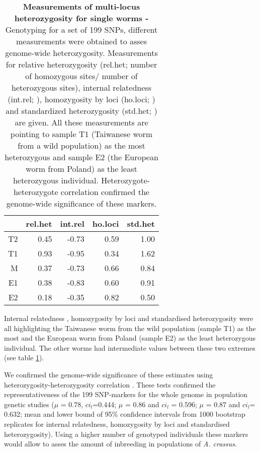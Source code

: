\begin{table}[ht]
\begin{center}
\begin{tabular}{rrrrr}
  \hline
 & rel.het & int.rel & ho.loci & std.het \\ 
  \hline
T2 & 0.45 & -0.73 & 0.59 & 1.00 \\ 
  T1 & 0.93 & -0.95 & 0.34 & 1.62 \\ 
  M & 0.37 & -0.73 & 0.66 & 0.84 \\ 
  E1 & 0.38 & -0.83 & 0.60 & 0.91 \\ 
  E2 & 0.18 & -0.35 & 0.82 & 0.50 \\ 
   \hline
\end{tabular}
\caption[Measurements of multi-locus heterozygosity for single
worms]{\textbf{Measurements of multi-locus heterozygosity for single
    worms -} Genotyping for a set of 199 SNPs, different measurements
  were obtained to asses genome-wide heterozygosity.  Measurements for
  relative heterozygosity (rel.het; number of homozygous sites/ number
  of heterozygous sites), internal relatedness (int.rel;
  \cite{pmid11571049}), homozygosity by loci (ho.loci;
  \cite{pmid17107491}) and standardized heterozygosity (std.het;
  \cite{coltman81j}) are given.  All these measurements are pointing
  to sample T1 (Taiwanese worm from a wild population) as the most
  heterozygous and sample E2 (the European worm from Poland) as the
  least heterozygous individual. Heterozygote-heterozygote correlation
  \cite{pmid21565077} confirmed the genome-wide significance of these
  markers.}
\label{snp-sing}
\end{center}
\end{table}

Internal relatedness \cite{pmid11571049}, homozygosity by loci
\cite{pmid17107491} and standardised heterozygosity \cite{coltman81j}
were all highlighting the Taiwanese worm from the wild population
(sample T1) as the most and the European worm from Poland (sample E2)
as the least heterozygous individual. The other worms had intermediate
values between these two extremes (see table \ref{snp-sing}).

We confirmed the genome-wide significance of these estimates using
heterozygosity-heterozygosity correlation \cite{pmid21565077}. These
tests confirmed the representativeness of the 199 SNP-markers for the
whole genome in population genetic studies ($\mu$ = 0.78,
$ci_l$=0.444; $\mu$ = 0.86 and $ci_l$ = 0.596; $\mu$ = 0.87 and
$ci_l$= 0.632; mean and lower bound of 95\% confidence intervals from
1000 bootstrap replicates for internal relatedness, homozygosity by
loci and standardised heterozygosity). Using a higher number of
genotyped individuals these markers would allow to asses the amount of
inbreeding in populations of \textit{A. crassus}.


